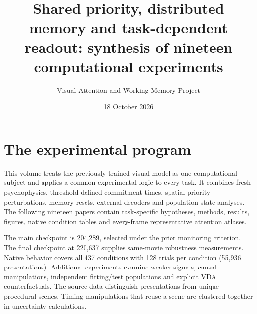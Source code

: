 \documentclass[11pt]{article}
\begin{document}
\title{Shared priority, distributed memory and task-dependent readout: synthesis of nineteen computational experiments}\author{Visual Attention and Working Memory Project}\date{18 October 2026}\maketitle
\section{The experimental program}
This volume treats the previously trained visual model as one computational subject and applies a common experimental logic to every task. It combines fresh psychophysics, threshold-defined commitment times, spatial-priority perturbations, memory resets, external decoders and population-state analyses. The following nineteen papers contain task-specific hypotheses, methods, results, figures, native condition tables and every-frame representative attention atlases.

The main checkpoint is 204,289, selected under the prior monitoring criterion. The final checkpoint at 220,637 supplies same-movie robustness measurements. Native behavior covers all 437 conditions with 128 trials per condition (55,936 presentations). Additional experiments examine weaker signals, causal manipulations, independent fitting/test populations and explicit VDA counterfactuals. The source data distinguish presentations from unique procedural scenes. Timing manipulations that reuse a scene are clustered together in uncertainty calculations.
\end{document}
